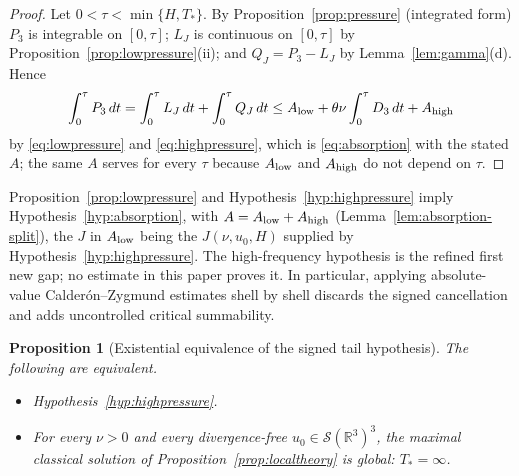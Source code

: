\documentclass[11pt]{article}
\newtheorem{proposition}[theorem]{Proposition}
\theoremstyle{definition}
\theoremstyle{plain}
\newcommand{\R}{\mathbb R}
\begin{document}
\begin{proof}
Let $0<\tau<\min\{H,T_*\}$.  By Proposition~\ref{prop:pressure} (integrated
form) $P_3$ is integrable on $[0,\tau]$; $L_J$ is continuous on $[0,\tau]$ by
Proposition~\ref{prop:lowpressure}(ii); and $Q_J=P_3-L_J$ by
Lemma~\ref{lem:gamma}(d).  Hence
\[
 \int_0^\tau P_3\,dt=\int_0^\tau L_J\,dt+\int_0^\tau Q_J\,dt
 \le A_{\rm low}+\theta\nu\int_0^\tau D_3\,dt+A_{\rm high}
\]
by \eqref{eq:lowpressure} and \eqref{eq:highpressure}, which is
\eqref{eq:absorption} with the stated $A$; the same $A$ serves for every
$\tau$ because $A_{\rm low}$ and $A_{\rm high}$ do not depend on $\tau$.
\end{proof}

Proposition~\ref{prop:lowpressure} and Hypothesis~\ref{hyp:highpressure}
imply Hypothesis~\ref{hyp:absorption}, with $A=A_{\rm low}+A_{\rm high}$
(Lemma~\ref{lem:absorption-split}), the $J$ in $A_{\rm low}$ being the
$J(\nu,u_0,H)$ supplied by Hypothesis~\ref{hyp:highpressure}.
The high-frequency
hypothesis is the refined first new gap; no estimate in this paper proves
it.  In particular, applying absolute-value Calder\'on--Zygmund estimates
shell by shell discards the signed cancellation and adds uncontrolled
critical summability.

\begin{proposition}[Existential equivalence of the signed tail hypothesis]
\label{prop:existential-equivalence}
The following are equivalent.
\begin{itemize}
\item[(A)] Hypothesis~\ref{hyp:highpressure}.
\item[(B)] For every $\nu>0$ and every divergence-free $u_0\in\mathcal S(\R^3)^3$,
the maximal classical solution of Proposition~\ref{prop:localtheory} is
global: $T_*=\infty$.
\end{itemize}
\end{proposition}
\end{document}
